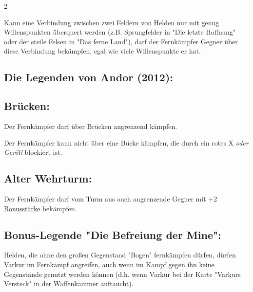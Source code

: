 \documentclass[10pt, a4paper, oneside]{book}
\newcommand{\fan}[1]{\textit{#1}}
\begin{document}
\begin{multicols*}{2}
\begin{nobgcolor}
Kann eine Verbindung zwischen zwei Feldern von Helden nur mit genug Willenspunkten überquert werden (z.B. Sprungfelder in "Die letzte Hoffnung"\supercite{dlh-begleitheft,dlh11-b} oder der steile Felsen in "Das ferne Land"), darf der Fernkämpfer Gegner über diese Verbindung bekämpfen, egal wie viele Willenspunkte er hat.




\end{nobgcolor}






\begin{bgcolor}
\section{Die Legenden von Andor (2012):}





\subsection{Brücken:}

Der Fernkämpfer darf über Brücken angrenzend kämpfen.
\supercite{38688}

Der Fernkämpfer kann nicht über eine Bücke kämpfen, die durch ein rotes X \fan{oder Geröll} blockiert ist.


\subsection{Alter Wehrturm:}

Der Fernkämpfer darf vom Turm aus auch angrenzende Gegner mit +2 \hyperref[bonusstaerke]{Bonusstärke} bekämpfen.
\supercite{dlva3-solo,dlva5-turm}




\subsection{Bonus-Legende "Die Befreiung der Mine":}

Helden, die ohne den großen Gegenstand "Bogen" fernkämpfen dürfen, dürfen Varkur im Fernkampf angreifen, auch wenn im Kampf gegen ihn keine Gegenstände genutzt werden können (d.h. wenn Varkur bei der Karte "Varkurs Versteck" in der Waffenkammer auftaucht).
\supercite{bl-bdm-versteck}



\end{bgcolor}







\end{multicols*}
\end{document}
